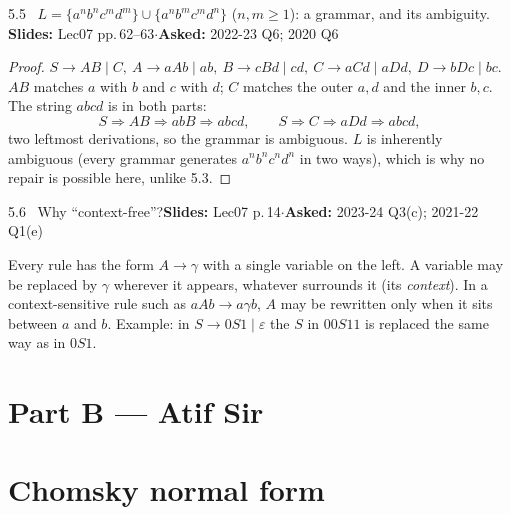 \documentclass[10.5pt,a4paper]{article}
\newcommand{\src}[2]{{\footnotesize\color{gray!70!black}\textbf{Slides:} #1\enspace$\cdot$\enspace\textbf{Asked:} #2}\par}
\newcommand{\eps}{\varepsilon}
\begin{document}
\begin{thm}{5.5 \ $L=\{a^nb^nc^md^m\}\cup\{a^nb^mc^md^n\}$ ($n,m\ge1$): a grammar, and its ambiguity.}
\src{Lec07 pp.\,62--63}{2022-23 Q6; 2020 Q6}\end{thm}
\begin{proof}
$S\to AB\mid C,\ A\to aAb\mid ab,\ B\to cBd\mid cd,\ C\to aCd\mid aDd,\ D\to bDc\mid bc.$
$AB$ matches $a$ with $b$ and $c$ with $d$; $C$ matches the outer $a,d$ and the inner $b,c$. The string $abcd$ is in both parts:
\[S\Rightarrow AB\Rightarrow abB\Rightarrow abcd,\qquad S\Rightarrow C\Rightarrow aDd\Rightarrow abcd,\]
two leftmost derivations, so the grammar is ambiguous. $L$ is inherently ambiguous (every grammar generates $a^nb^nc^nd^n$ in two ways), which
is why no repair is possible here, unlike 5.3.
\end{proof}

\begin{thm}{5.6 \ Why ``context-free''?}\src{Lec07 p.\,14}{2023-24 Q3(c); 2021-22 Q1(e)}\end{thm}
Every rule has the form $A\to\gamma$ with a single variable on the left. A variable may be replaced by $\gamma$ wherever it appears,
whatever surrounds it (its \emph{context}). In a context-sensitive rule such as $aAb\to a\gamma b$, $A$ may be rewritten only when it sits
between $a$ and $b$. Example: in $S\to0S1\mid\eps$ the $S$ in $00S11$ is replaced the same way as in $0S1$.

\clearpage
\section*{Part B --- Atif Sir}

\section{Chomsky normal form}
\end{document}
